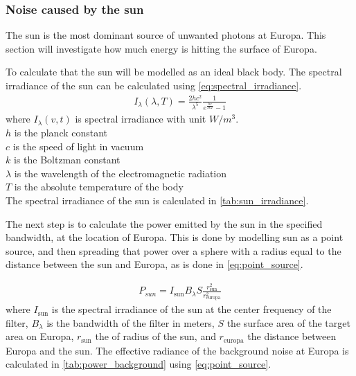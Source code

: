\subsubsection{Noise caused by the sun}\label{ssec:background_noise}
The sun is the most dominant source of unwanted photons at Europa. This section will investigate how much energy is hitting the surface of Europa. 

To calculate that the sun will be modelled as an ideal black body. The spectral irradiance of the sun can be calculated using \cref{eq:spectral_irradiance}.
\begin{align}\label{eq:spectral_irradiance}
I_\lambda(\lambda,T) = \frac{2hc^2}{\lambda^5}\frac{1}{e^{\frac{hc}{\lambda kT}}-1}
\end{align}
where $I_\lambda(v,t)$ is spectral irradiance with unit $W/m^3$. \\
$h$ is the planck constant\\
$c$ is the speed of light in vacuum \\
$k$ is the Boltzman constant \\
$\lambda$ is the wavelength of the electromagnetic radiation\\
$T$ is the absolute temperature of the body\\



The spectral irradiance of the sun is calculated in \cref{tab:sun_irradiance}.



The next step is to calculate the power emitted by the sun in the specified bandwidth, at the location of Europa. This is done by modelling sun as a point source, and then spreading that power over a sphere with a radius equal to the distance between the sun and Europa, as is done in \cref{eq:point_source}.

\begin{align}\label{eq:point_source}
    P_{sun} = I_{\text{sun}} B_\lambda S \frac{r_{\text{sun}}^2}{r_{\text{europa}}^2}
\end{align}
where $I_{\text{sun}}$ is the spectral irradiance of the sun at the center frequency of the filter, $B_\lambda$ is the bandwidth of the filter in meters, $S$ the surface area of the target area on Europa, $r_{\text{sun}}$ the of radius of the sun, and $r_{\text{europa}}$ the distance between Europa and the sun. The effective radiance of the background noise at Europa is calculated in \cref{tab:power_background} using \cref{eq:point_source}.


